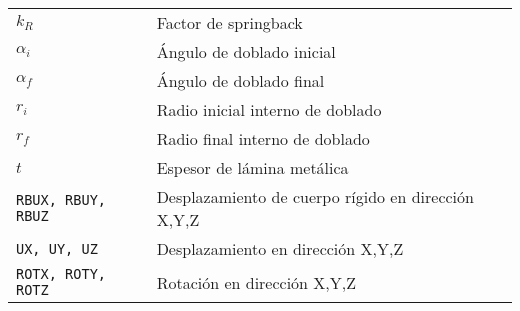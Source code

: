\begin{table}[h]
\begin{tabular}{p{4cm} p{12cm}}
$ k_R $ &                                     Factor de springback \\
$ \alpha_i $ & 								  Ángulo de doblado inicial \\
$ \alpha_f $ & 								  Ángulo de doblado final \\
$ r_i $ & 									  Radio inicial interno de doblado \\
$ r_f $ & 									  Radio final interno de doblado \\
$ t $ &                                       Espesor de lámina metálica \\
{\tt RBUX, RBUY, RBUZ} &                      Desplazamiento de cuerpo rígido en dirección X,Y,Z \\
{\tt UX, UY, UZ} &                            Desplazamiento en dirección X,Y,Z \\
{\tt ROTX, ROTY, ROTZ} & 					  Rotación en dirección X,Y,Z

\end{tabular}
\end{table}
